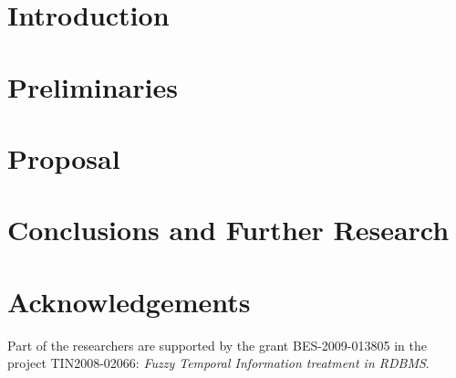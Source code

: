 \documentclass{llncs}
\begin{document}
%
\section{Introduction}
\label{sec:Introduction}

%

\section{Preliminaries}
\label{sec:preliminaries}




\section{Proposal}
\label{sec:proposal}



%
%
%
\section{Conclusions and Further Research}
\label{sec:futher-research}

%




%
\section*{Acknowledgements}
%
Part of the researchers are supported by the grant BES-2009-013805 in the project TIN2008-02066: \emph{Fuzzy Temporal Information treatment in RDBMS}.




\end{document}
